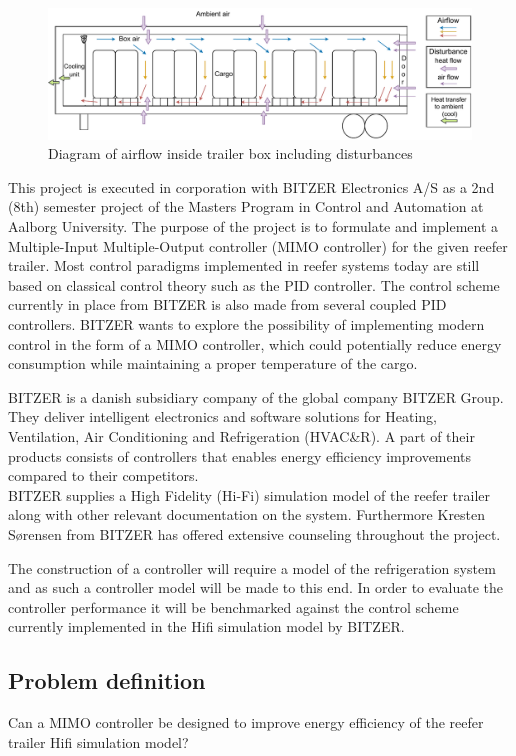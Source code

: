 \begin{figure}[h]
	\centering
	\includegraphics[width = 0.8\linewidth]{Graphics/Trailer_airflow.pdf}
	\caption{Diagram of airflow inside trailer box including disturbances}
	\label{fig:trailer_airflow}
\end{figure}

This project is executed in corporation with BITZER Electronics A/S as a 2nd (8th) semester project of the Masters Program in Control and Automation at Aalborg University. The purpose of the project is to formulate and implement a Multiple-Input Multiple-Output controller (MIMO controller) for the given reefer trailer. Most control paradigms implemented in reefer systems today are still based on classical control theory such as the PID controller. The control scheme currently in place from BITZER is also made from several coupled PID controllers. BITZER wants to explore the possibility of implementing modern control in the form of a MIMO controller, which could potentially reduce energy consumption while maintaining a proper temperature of the cargo.

BITZER is a danish subsidiary company of the global company BITZER Group. They deliver intelligent electronics and software solutions for Heating, Ventilation, Air Conditioning and Refrigeration (HVAC\&R). A part of their products consists of controllers that enables energy efficiency improvements compared to their competitors. \\

BITZER supplies a High Fidelity (Hi-Fi) simulation model of the reefer trailer along with other relevant documentation on the system. Furthermore Kresten Sørensen from BITZER has offered extensive counseling throughout the project.

The construction of a controller will require a model of the refrigeration system and as such a controller model will be made to this end. In order to evaluate the controller performance it will be benchmarked against the control scheme currently implemented in the Hifi simulation model by BITZER. 

\subsection{Problem definition}
Can a MIMO controller be designed to improve energy efficiency of the reefer trailer Hifi simulation model?